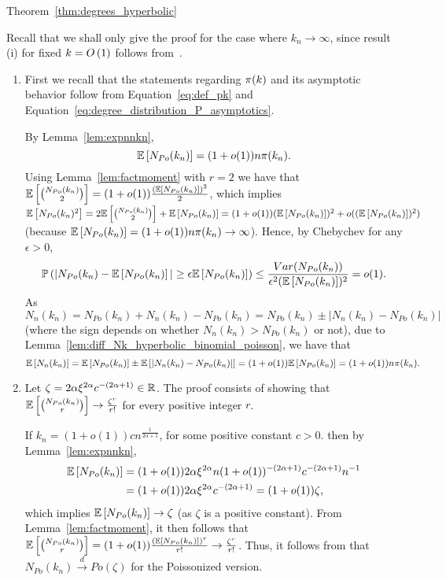 \begin{proofof}{Theorem~\ref{thm:degrees_hyperbolic}}

Recall that we shall only give the proof for the case where $k_n \to \infty$, since result (i) for fixed $k = O\left(1\right)$ follows from~\cite{gugelmann2012random}.

\begin{enumerate}[\upshape (i)]
\item  First we recall that the statements regarding ${\pi}(k)$ and its asymptotic behavior follow from Equation~\ref{eq:def_pk} and Equation~\ref{eq:degree_distribution_P_asymptotics}.

By Lemma~\ref{lem:expnnkn},
\[
\mathbb{E}\left[{ N_{Po}(k_n) }\right]=(1+o(1))n {\pi}(k_n).
\]
Using Lemma~\ref{lem:factmoment} with $r=2$ we have that $\mathbb{E}\left[{N_{Po}(k_n) \choose 2}\right] = (1+o(1))\frac{(\mathbb{E}\left[ N_{Po}(k_n)\right])^2}{2}$, which implies $\mathbb{E}\left[N_{Po}(k_n)^2\right] = 2\mathbb{E}\left[{N_{Po}(k_n) \choose 2}\right] +\mathbb{E}\left[N_{Po}(k_n)\right] = (1+o(1))(\mathbb{E}\left[ N_{Po}(k_n)\right])^2 +o((\mathbb{E}\left[N_{Po}(k_n)\right])^2)$ (because $\mathbb{E}\left[N_{Po}(k_n)\right] = (1+o(1)) n{\pi}(k_n) \rightarrow \infty$). Hence, by Chebychev for any $\epsilon >0$,
\[
	\mathbb{P}\left(|N_{Po}(k_n)-\mathbb{E}\left[N_{Po}(k_n)\right]|\geq \epsilon \mathbb{E}\left[N_{Po}(k_n)\right]\right)
	\leq \frac{Var(N_{Po}(k_n))}{\epsilon^2 (\mathbb{E}\left[ N_{Po}(k_n)\right])^2} = o(1).
\]
As $N_n(k_n)=N_{Po}(k_n)+N_n(k_n)-N_{Po}(k_n) = N_{Po}(k_n)\pm |N_n(k_n)-N_{Po}(k_n)|$ (where the sign depends on whether $N_n(k_n)>N_{Po}(k_n)$ or not), due to Lemma~\ref{lem:diff_Nk_hyperbolic_binomial_poisson}, we have that
\[
	\mathbb{E}\left[N_n(k_n)\right] = \mathbb{E}\left[N_{Po}(k_n)\right] \pm \mathbb{E}\left[ |N_n(k_n)-N_{Po}(k_n)|\right] = (1+o(1))\mathbb{E}\left[N_{Po}(k_n)\right] = (1+o(1))n {\pi}(k_n).
\]

\item Let $\zeta = 2\alpha \xi^{2\alpha}c^{-(2\alpha+1)} \in {\ensuremath{\mathbb R}}$.
The proof consists of showing that $\mathbb{E}\left[{N_{Po}(k_n) \choose r} \right] \rightarrow \frac{\zeta^r}{r!}$ for every positive integer $r$.%

If $k_n=(1+o(1))c n^{\frac{1}{2\alpha+1}}$, for some positive constant $c > 0$. then by Lemma~\ref{lem:expnnkn},
\begin{align*}
	\mathbb{E}\left[N_{Po}(k_n)\right] &= (1+o(1))2\alpha \xi^{2\alpha} n (1+o(1))^{-(2\alpha+1)} c^{-(2\alpha+1)}n^{-1} \\
	&= (1+o(1))2\alpha \xi^{2\alpha} c^{-(2\alpha+1)}=(1+o(1))\zeta,
\end{align*}
which implies $\mathbb{E}\left[N_{Po}(k_n)\right] \rightarrow \zeta$ (as $\zeta$ is a positive constant). From Lemma~\ref{lem:factmoment}, it then follows that $\mathbb{E}\left[{N_{Po}(k_n) \choose r}\right] =(1+o(1))\frac{(\mathbb{E}\left[ N_{Po}(k_n)\right])^r}{r!}\rightarrow \frac{\zeta^r}{r!}$. Thus, it follows from \cite[Theorem 8.3.1]{alon2016probabilistic} that $N_{Po}(k_n) \xrightarrow{d} Po(\zeta)$ for the Poissonized version.


\end{enumerate}
\end{proofof}
